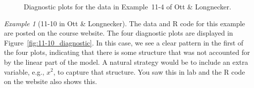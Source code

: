 \documentclass[a4paper, 12pt]{article}
\theoremstyle{plain}
\theoremstyle{definition}
\theoremstyle{remark}
\newtheorem*{example}{Example}
\begin{document}
\begin{figure}
\begin{center}
\end{center}
\caption{Diagnostic plots for the data in Example~11-4 of Ott \& Longnecker.}
\label{fig:11-4_diagnostic}
\end{figure}

\begin{example}[11-10 in Ott \& Longnecker]
The data and R code for this example are posted on the course website.  The four diagnostic plots are displayed in Figure~\ref{fig:11-10_diagnostic}.  In this case, we see a clear pattern in the first of the four plots, indicating that there is some structure that was not accounted for by the linear part of the model.  A natural strategy would be to include an extra variable, e.g., $x^2$, to capture that structure.  You saw this in lab and the R code on the website also shows this.  
\end{example}
\end{document}
